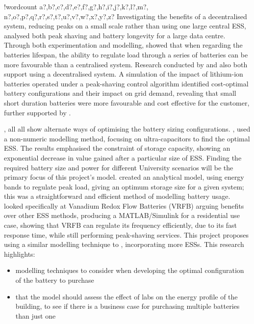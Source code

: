 \documentclass[fontsize=9.5pt]{extarticle}
\numberwithin{figure}{section} %
\providecommand{\tightlist}{%
  \setlength{\itemsep}{0pt}\setlength{\parskip}{0pt}}
\newcounter{words}
\newenvironment{counted}{%
  \setcounter{words}{0}
  \SearchList!{wordcount}{\stepcounter{words}}
    {a?,b?,c?,d?,e?,f?,g?,h?,i?,j?,k?,l?,m?,
    n?,o?,p?,q?,r?,s?,t?,u?,v?,w?,x?,y?,z?}
  \UndoBoundary{'}
  \SearchOrder{p;}}{%
  \StopSearching}
\begin{document}
\begin{counted}
Investigating the benefits of a decentralised system, reducing peaks on
a small scale rather than using one large central ESS, \cite{6604477}
analysed both peak shaving and battery longevity for a large data
centre. Through both experimentation and modelling, \cite{6604477}
showed that when regarding the batteries lifespan, the ability to
regulate load through a series of batteries can be more favourable than
a centralised system. Research conducted by \cite{6348200} and
\cite{Demonstr51:online} also both support using a decentralised system.
A simulation of the impact of lithium-ion batteries operated under a
peak-shaving control algorithm identified cost-optimal battery
configurations and their impact on grid demand, revealing that small
short duration batteries were more favourable and cost effective for the
customer, further supported by \cite{20164002874437}.

\cite{20160601898032}, \cite{Levron201280} all \cite{5371839} all show
alternate ways of optimising the battery sizing configurations.
\cite{5371839}, used a non-numeric modelling method, focusing on
ultra-capacitors to find the optimal ESS. The results emphasised the
constraint of storage capacity, showing an exponential decrease in value
gained after a particular size of ESS. Finding the required battery size
and power for different University scenarios will be the primary focus
of this project's model. \cite{Levron201280} created an analytical
model, using energy bands to regulate peak load, giving an optimum
storage size for a given system; this was a straightforward and
efficient method of modelling battery usage. \cite{20160601898032}
looked specifically at Vanadium Redox Flow Batteries (VRFB) arguing
benefits over other ESS methods, producing a MATLAB/Simulink for a
residential use case, showing that VRFB can regulate its frequency
efficiently, due to its fast response time, while still performing
peak-shaving services. This project proposes using a similar modelling
technique to \cite{20160601898032}, incorporating more ESSs. This
research highlights:

\begin{itemize}
\tightlist
\item
  modelling techniques to consider when developing the optimal
  configuration of the battery to purchase
\item
  that the model should assess the effect of labs on the energy profile
  of the building, to see if there is a business case for purchasing
  multiple batteries than just one
\end{itemize}


\end{counted}
\end{document}
